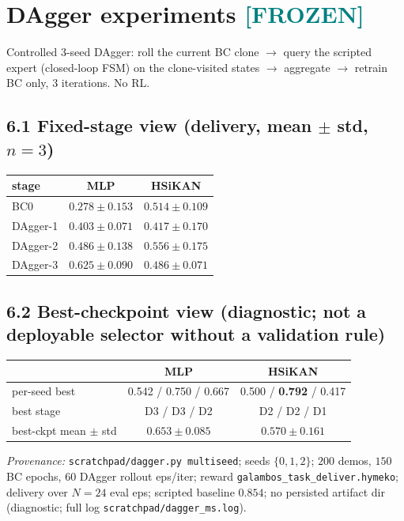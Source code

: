 \documentclass[11pt]{article}
\newcommand{\frozen}{\textcolor{teal}{\textbf{[FROZEN]}}}
\newcommand{\fn}[1]{\texttt{#1}}
\begin{document}
\section{DAgger experiments \frozen}
Controlled 3-seed DAgger: roll the current BC clone $\to$ query the scripted expert (closed-loop FSM) on the
clone-visited states $\to$ aggregate $\to$ retrain BC only, 3 iterations. No RL.

\subsection*{6.1 Fixed-stage view (delivery, mean $\pm$ std, $n=3$)}
\begin{center}\begin{tabular}{lcc}
\toprule
stage & MLP & HSiKAN\\
\midrule
BC0 & $0.278\pm0.153$ & $0.514\pm0.109$\\
DAgger-1 & $0.403\pm0.071$ & $0.417\pm0.170$\\
DAgger-2 & $0.486\pm0.138$ & $0.556\pm0.175$\\
DAgger-3 & $\mathbf{0.625\pm0.090}$ & $0.486\pm0.071$\\
\bottomrule
\end{tabular}\end{center}

\subsection*{6.2 Best-checkpoint view (diagnostic; not a deployable selector without a validation rule)}
\begin{center}\begin{tabular}{lcc}
\toprule
 & MLP & HSiKAN\\
\midrule
per-seed best & 0.542 / 0.750 / 0.667 & 0.500 / \textbf{0.792} / 0.417\\
best stage & D3 / D3 / D2 & D2 / D2 / D1\\
best-ckpt mean $\pm$ std & $\mathbf{0.653\pm0.085}$ & $0.570\pm0.161$\\
\bottomrule
\end{tabular}\end{center}
\emph{Provenance:} \fn{scratchpad/dagger.py multiseed}; seeds $\{0,1,2\}$; $200$ demos, $150$ BC epochs, $60$
DAgger rollout eps/iter; reward \fn{galambos\_task\_deliver.hymeko}; delivery over $N=24$ eval eps; scripted
baseline $0.854$; no persisted artifact dir (diagnostic; full log \fn{scratchpad/dagger\_ms.log}).
\end{document}
